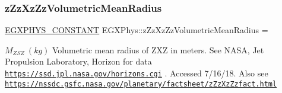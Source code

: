 \subsubsection{\texorpdfstring{z\+Zz\+Xz\+Zz\+Volumetric\+Mean\+Radius}{zZzXzZzVolumetricMeanRadius}}
{\footnotesize\ttfamily \mbox{\hyperlink{group___e_g_x_phys-_constants-_macros_ga76980d288494ce1714c9ac68a95ba702}{E\+G\+X\+P\+H\+Y\+S\+\_\+\+C\+O\+N\+S\+T\+A\+NT}} E\+G\+X\+Phys\+::z\+Zz\+Xz\+Zz\+Volumetric\+Mean\+Radius =}

$M_{ZSZ} \ (kg)$ Volumetric mean radius of Z\+XZ in meters. See N\+A\+SA, Jet Propulsion Laboratory, Horizon for data \href{https://ssd.jpl.nasa.gov/horizons.cgi}{\tt https\+://ssd.\+jpl.\+nasa.\+gov/horizons.\+cgi} . Accessed 7/16/18. Also see \href{https://nssdc.gsfc.nasa.gov/planetary/factsheet/zZzXzZzfact.html}{\tt https\+://nssdc.\+gsfc.\+nasa.\+gov/planetary/factsheet/z\+Zz\+Xz\+Zzfact.\+html} 
